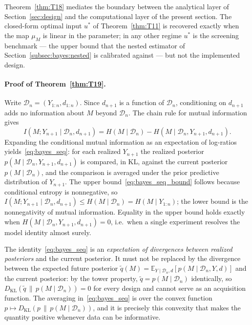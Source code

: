\begin{remark}
Theorem~\ref{thm:T18} mediates the boundary between the analytical layer of Section~\ref{sec:design} and the computational layer of the present section. The closed-form optimal input $u^{*}$ of Theorem~\ref{thm:T11} is recovered exactly when the map $\mu_M$ is linear in the parameter; in any other regime $u^{*}$ is the screening benchmark --- the upper bound that the nested estimator of Section~\ref{subsec:bayes:nested} is calibrated against --- but not the implemented design.
\end{remark}

\paragraph{Proof of Theorem~\ref{thm:T19}.}
Write $\mathcal{D}_n = (Y_{1:n}, d_{1:n})$. Since $d_{n+1}$ is a function of $\mathcal{D}_n$, conditioning on $d_{n+1}$ adds no information about $M$ beyond $\mathcal{D}_n$. The chain rule for mutual information gives
\[
I(M; Y_{n+1} \mid \mathcal{D}_n, d_{n+1})
= H(M \mid \mathcal{D}_n) - H(M \mid \mathcal{D}_n, Y_{n+1}, d_{n+1}).
\]
Expanding the conditional mutual information as an expectation of log-ratios yields~\eqref{eq:bayes_seq}: for each realized $Y_{n+1}$ the realized posterior $p(M \mid \mathcal{D}_n, Y_{n+1}, d_{n+1})$ is compared, in KL, against the current posterior $p(M \mid \mathcal{D}_n)$, and the comparison is averaged under the prior predictive distribution of $Y_{n+1}$. The upper bound~\eqref{eq:bayes_seq_bound} follows because conditional entropy is nonnegative, so $I(M; Y_{n+1} \mid \mathcal{D}_n, d_{n+1}) \le H(M \mid \mathcal{D}_n) = H(M \mid Y_{1:n})$; the lower bound is the nonnegativity of mutual information. Equality in the upper bound holds exactly when $H(M \mid \mathcal{D}_n, Y_{n+1}, d_{n+1}) = 0$, i.e.\ when a single experiment resolves the model identity almost surely.

\begin{remark}
\label{rem:tower}
The identity~\eqref{eq:bayes_seq} is an \emph{expectation of divergences between realized posteriors} and the current posterior. It must not be replaced by the divergence between the expected future posterior $\tilde q(M) = \mathbb{E}_{Y \mid \mathcal{D}_n, d}[p(M \mid \mathcal{D}_n, Y, d)]$ and the current posterior: by the tower property, $\tilde q = p(M \mid \mathcal{D}_n)$ identically, so $D_{\mathrm{KL}}(\tilde q \,\|\, p(M \mid \mathcal{D}_n)) = 0$ for every design and cannot serve as an acquisition function. The averaging in~\eqref{eq:bayes_seq} is over the convex function $p \mapsto D_{\mathrm{KL}}(p \,\|\, p(M \mid \mathcal{D}_n))$, and it is precisely this convexity that makes the quantity positive whenever data can be informative.
\end{remark}

